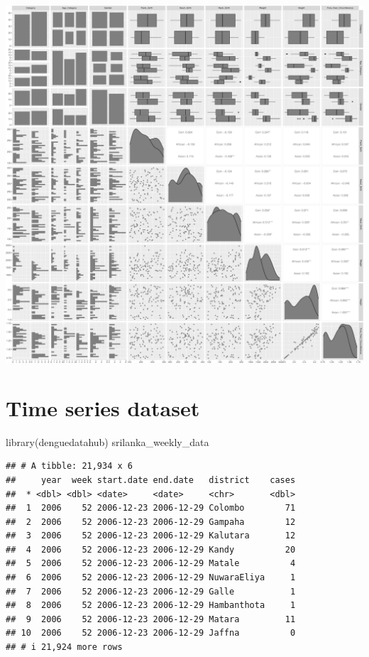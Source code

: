 \documentclass[
]{book}
\newenvironment{Shaded}{\begin{snugshade}}{\end{snugshade}}
\newcommand{\FunctionTok}[1]{\textcolor[rgb]{0.00,0.00,0.00}{#1}}
\newcommand{\NormalTok}[1]{#1}
\begin{document}
\includegraphics{Data-Visualisation-geom-Encyclopedia_files/figure-latex/unnamed-chunk-11-1.pdf}

\hypertarget{time-series-dataset}{%
\section{Time series dataset}\label{time-series-dataset}}

\begin{Shaded}
\begin{Highlighting}[]
\FunctionTok{library}\NormalTok{(denguedatahub)}
\NormalTok{srilanka\_weekly\_data}
\end{Highlighting}
\end{Shaded}

\begin{verbatim}
## # A tibble: 21,934 x 6
##     year  week start.date end.date   district    cases
##  * <dbl> <dbl> <date>     <date>     <chr>       <dbl>
##  1  2006    52 2006-12-23 2006-12-29 Colombo        71
##  2  2006    52 2006-12-23 2006-12-29 Gampaha        12
##  3  2006    52 2006-12-23 2006-12-29 Kalutara       12
##  4  2006    52 2006-12-23 2006-12-29 Kandy          20
##  5  2006    52 2006-12-23 2006-12-29 Matale          4
##  6  2006    52 2006-12-23 2006-12-29 NuwaraEliya     1
##  7  2006    52 2006-12-23 2006-12-29 Galle           1
##  8  2006    52 2006-12-23 2006-12-29 Hambanthota     1
##  9  2006    52 2006-12-23 2006-12-29 Matara         11
## 10  2006    52 2006-12-23 2006-12-29 Jaffna          0
## # i 21,924 more rows
\end{verbatim}
\end{document}
